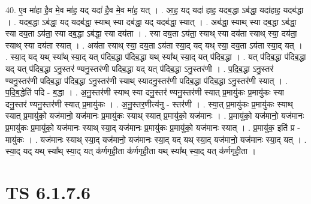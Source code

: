 \documentclass[17pt]{extarticle}
\begin{document}
40. ए॒व मा॑हा है॒व मे॒व मा॑ह॒ यद् यदा॑ है॒व मे॒व मा॑ह॒ यत् । . आ॒ह॒ यद् यदा॑ हाह॒ यदब॒द्धा ऽब॑द्धा॒ यदा॑हाह॒ यदब॑द्धा । . यदब॒द्धा ऽब॑द्धा॒ यद् यदब॑द्धा॒ स्याथ् स्या दब॑द्धा॒ यद् यदब॑द्धा॒ स्यात् । . अब॑द्धा॒ स्याथ् स्या दब॒द्धा ऽब॑द्धा॒ स्या दय॒ता ऽय॑ता॒ स्या दब॒द्धा ऽब॑द्धा॒ स्या दय॑ता । . स्या दय॒ता ऽय॑ता॒ स्याथ् स्या दय॑ता स्याथ् स्या॒ दय॑ता॒ स्याथ् स्या दय॑ता स्यात् । . अय॑ता स्याथ् स्या॒ दय॒ता ऽय॑ता स्या॒द् यद् यथ् स्या॒ दय॒ता ऽय॑ता स्या॒द् यत् । . स्या॒द् यद् यथ् स्या᳚थ् स्या॒द् यत् प॑दिब॒द्धा प॑दिब॒द्धा यथ् स्या᳚थ् स्या॒द् यत् प॑दिब॒द्धा । . यत् प॑दिब॒द्धा प॑दिब॒द्धा यद् यत् प॑दिब॒द्धा ऽनु॒स्तर॑ ण्यनु॒स्तर॑णी पदिब॒द्धा यद् यत् प॑दिब॒द्धा ऽनु॒स्तर॑णी । . प॒दि॒ब॒द्धा ऽनु॒स्तर॑ ण्यनु॒स्तर॑णी पदिब॒द्धा प॑दिब॒द्धा ऽनु॒स्तर॑णी स्याथ् स्यादनु॒स्तर॑णी पदिब॒द्धा प॑दिब॒द्धा ऽनु॒स्तर॑णी स्यात् । . प॒दि॒ब॒द्धेति॑ पदि - ब॒द्धा । . अ॒नु॒स्तर॑णी स्याथ् स्या दनु॒स्तर॑ ण्यनु॒स्तर॑णी स्यात् प्र॒मायु॑कः प्र॒मायु॑कः स्या दनु॒स्तर॑ ण्यनु॒स्तर॑णी स्यात् प्र॒मायु॑कः । . अ॒नु॒स्तर॒णीत्य॑नु - स्तर॑णी । . स्या॒त् प्र॒मायु॑कः प्र॒मायु॑कः स्याथ् स्यात् प्र॒मायु॑को॒ यज॑मानो॒ यज॑मानः प्र॒मायु॑कः स्याथ् स्यात् प्र॒मायु॑को॒ यज॑मानः । . प्र॒मायु॑को॒ यज॑मानो॒ यज॑मानः प्र॒मायु॑कः प्र॒मायु॑को॒ यज॑मानः स्याथ् स्या॒द् यज॑मानः प्र॒मायु॑कः प्र॒मायु॑को॒ यज॑मानः स्यात् । . प्र॒मायु॑क॒ इति॑ प्र - मायु॑कः । . यज॑मानः स्याथ् स्या॒द् यज॑मानो॒ यज॑मानः स्या॒द् यद् यथ् स्या॒द् यज॑मानो॒ यज॑मानः स्या॒द् यत् । . स्या॒द् यद् यथ् स्या᳚थ् स्या॒द् यत् क॑र्णगृही॒ता क॑र्णगृही॒ता यथ् स्या᳚थ् स्या॒द् यत् क॑र्णगृही॒ता । \newline
\pagebreak
{}

\section{ TS 6.1.7.6 }
\end{document}
